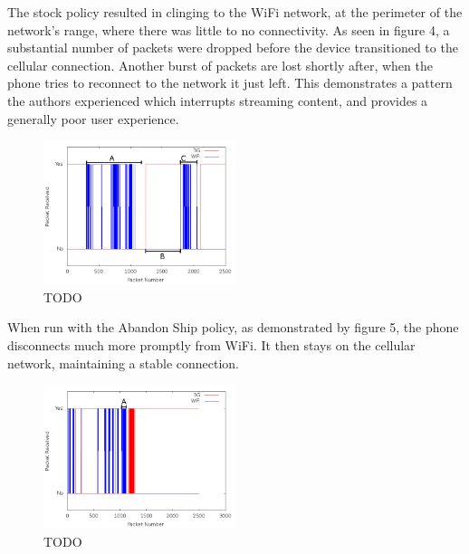 The stock policy resulted in clinging to the WiFi network, at the perimeter of the network's range, where there was little to no connectivity. As seen in figure 4, a substantial number of packets were dropped before the device transitioned to the cellular connection. Another burst of packets are lost shortly after, when the phone tries to reconnect to the network it just left. This demonstrates a pattern the authors experienced which interrupts streaming content, and provides a generally poor user experience.

\begin{figure}
	\includegraphics[width=0.5\textwidth]{leavingCourtyardsNoPolicy}
	\caption{TODO}
\end{figure}

When run with the Abandon Ship policy, as demonstrated by figure 5, the phone disconnects much more promptly from WiFi. It then stays on the cellular network, maintaining a stable connection.

\begin{figure}
	\includegraphics[width=0.5\textwidth]{leavingCourtyardsWithPolicy}
	\caption{TODO}
\end{figure}


